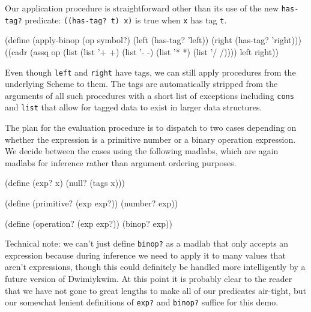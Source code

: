 \documentclass[11pt]{article}
\begin{document}
Our application procedure is straightforward
other than its use of the new \texttt{has-tag?} predicate:
\texttt{((has-tag? t) x)} is true when \texttt{x} has tag \texttt{t}.
\begin{verbbox}
(define (apply-binop (op symbol?)
                     (left (has-tag? 'left))
                     (right (has-tag? 'right)))
  ((cadr (assq op
               (list (list '+ +)
                     (list '- -)
                     (list '* *)
                     (list '/ /))))
   left
   right))
\end{verbbox}
\begin{quote}\theverbbox\end{quote}
Even though \texttt{left} and \texttt{right} have tags,
we can still apply procedures from the underlying Scheme to them.
The tags are automatically stripped from the arguments of all such procedures
with a short list of exceptions including \texttt{cons} and \texttt{list}
that allow for tagged data to exist in larger data structures.

The plan for the evaluation procedure is to dispatch to two cases
depending on whether the expression is a primitive number
or a binary operation expression.
We decide between the cases using the following madlabs,
which are again madlabs for inference rather than argument ordering purposes.
\begin{verbbox}
(define (exp? x)
  (null? (tags x)))

(define (primitive? (exp exp?))
  (number? exp))

(define (operation? (exp exp?))
  (binop? exp))
\end{verbbox}
\begin{quote}\theverbbox\end{quote}
Technical note: we can't just define \texttt{binop?} as a madlab
that only accepts an expression
because during inference we need to apply it
to many values that aren't expressions,
though this could definitely be handled more intelligently
by a future version of Dwimiykwim.
At this point it is probably clear to the reader that
we have not gone to great lengths to make all of our predicates air-tight,
but our somewhat lenient definitions of \texttt{exp?} and \texttt{binop?}
suffice for this demo.
\end{document}
